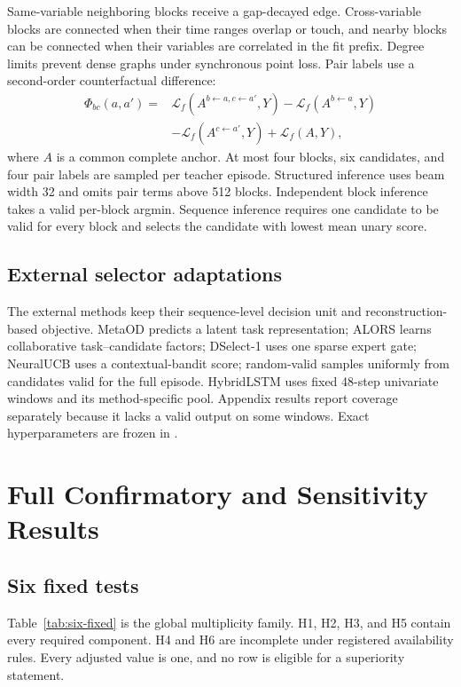 Same-variable neighboring blocks receive a gap-decayed edge. Cross-variable blocks are connected when their time ranges overlap or touch, and nearby blocks can be connected when their variables are correlated in the fit prefix. Degree limits prevent dense graphs under synchronous point loss. Pair labels use a second-order counterfactual difference:
\begin{align}
\Phi_{bc}(a,a')={}&\mathcal L_f(A^{b\leftarrow a,c\leftarrow a'},Y)
-\mathcal L_f(A^{b\leftarrow a},Y)\nonumber\\
&-\mathcal L_f(A^{c\leftarrow a'},Y)+\mathcal L_f(A,Y),
\end{align}
where $A$ is a common complete anchor. At most four blocks, six candidates, and four pair labels are sampled per teacher episode. Structured inference uses beam width 32 and omits pair terms above 512 blocks. Independent block inference takes a valid per-block argmin. Sequence inference requires one candidate to be valid for every block and selects the candidate with lowest mean unary score.

\subsection{External selector adaptations}

The external methods keep their sequence-level decision unit and reconstruction-based objective. MetaOD predicts a latent task representation; ALORS learns collaborative task--candidate factors; DSelect-1 uses one sparse expert gate; NeuralUCB uses a contextual-bandit score; random-valid samples uniformly from candidates valid for the full episode. HybridLSTM uses fixed 48-step univariate windows and its method-specific pool. Appendix results report coverage separately because it lacks a valid output on some windows. Exact hyperparameters are frozen in .

\section{Full Confirmatory and Sensitivity Results}
\label{app:full-results}

\subsection{Six fixed tests}

Table~\ref{tab:six-fixed} is the global multiplicity family. H1, H2, H3, and H5 contain every required component. H4 and H6 are incomplete under registered availability rules. Every adjusted value is one, and no row is eligible for a superiority statement.

